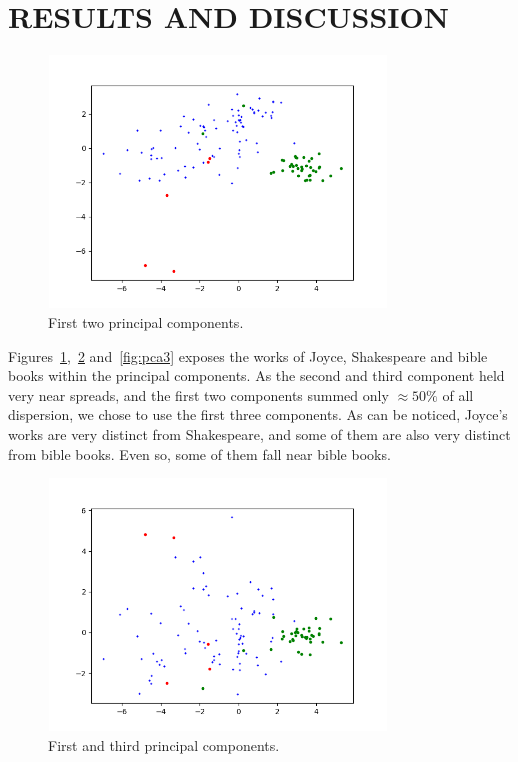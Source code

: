 \documentclass[12pt,fleqn]{article}
\begin{document}
\section{RESULTS AND DISCUSSION}\label{sec:res}

\begin{figure}[!htbp] %
\vspace{-2pt}
\begin{center}
\includegraphics[height=6.7cm,width=9cm]{figs/pca}%
\caption{First two principal components.}
\label{fig:pca1}%
\end{center}
\end{figure}

Figures~\ref{fig:pca1},~\ref{fig:pca2} and~\ref{fig:pca3} exposes the works of Joyce,
Shakespeare and bible books within the principal components.
As the second and third component held very near spreads,
and the first two components summed only $\approx 50\%$ of all dispersion,
we chose to use the first three components.
As can be noticed, Joyce's works are very distinct from Shakespeare,
and some of them are also very distinct from bible books.
Even so, some of them fall near bible books.

\begin{figure}[!htbp] %
\vspace{-2pt}
\begin{center}
\includegraphics[height=6.7cm,width=9cm]{figs/pca2}%
\caption{First and third principal components.}
\label{fig:pca2}%
\end{center}
\end{figure}
\end{document}
